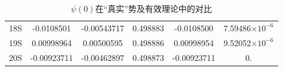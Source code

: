 \documentclass[cs4size,titlepage,twoside]{ctexart}
\begin{document}
\begin{table}[!htbp]
\begin{tabular}{|cccccc|}
		18S                   & -0.0108501               & -0.00543717                    & 0.498883                       & -0.0108500                                                                & 7.59486$\times10^{-6}$   \\
		19S                   & 0.00998964               & 0.00500595                     & 0.498886                       & 0.00998954                                                                & 9.52052$\times10^{-6}$   \\
		20S                   & -0.00923711              & -0.00462897                    & 0.498873                       & -0.00923711                                                               & 0.                       \\
		\hline
	\end{tabular}
	\caption{$\psi(0)$在“真实”势及有效理论中的对比}\label{psi01}
\end{table}
\end{document}
